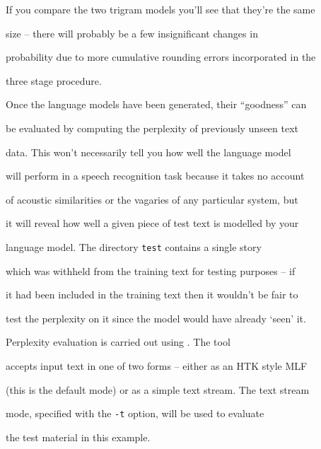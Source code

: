 If you compare the two trigram models you'll see that they're the same


size -- there will probably be a few insignificant changes in


probability due to more cumulative rounding errors incorporated in the


three stage procedure.












Once the language models have been generated, their ``goodness'' can


be evaluated by computing the perplexity of previously unseen text


data.  This won't necessarily tell you how well the language model


will perform in a speech recognition task because it takes no account


of acoustic similarities or the vagaries of any particular system, but


it will reveal how well a given piece of test text is modelled by your


language model.  The directory \texttt{test} contains a single story


which was withheld from the training text for testing purposes -- if


it had been included in the training text then it wouldn't be fair to


test the perplexity on it since the model would have already `seen' it.





Perplexity evaluation is carried out using . The tool


accepts input text in one of two forms -- either as an HTK style MLF


(this is the default mode) or as a simple text stream. The text stream


mode, specified with the \texttt{-t} option, will be used to evaluate


the test material in this example.





